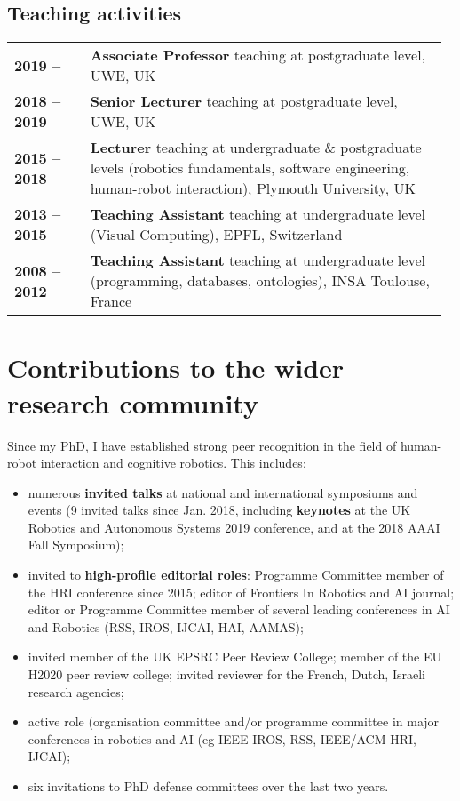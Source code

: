 \subsection{Teaching activities}

\begin{tabular}{p{0.17\linewidth}p{0.8\linewidth}}
    \bf 2019 --  & \textbf{Associate Professor} teaching at postgraduate level, UWE, UK \\
    \bf 2018 -- 2019 & \textbf{Senior Lecturer} teaching at postgraduate level, UWE, UK \\
    \bf 2015 -- 2018 & \textbf{Lecturer} teaching at undergraduate \&
    postgraduate levels (robotics fundamentals, software engineering, human-robot interaction), Plymouth University, UK \\
    \bf 2013 -- 2015 & \textbf{Teaching Assistant} teaching at undergraduate level (Visual Computing), EPFL, Switzerland \\
    \bf 2008 -- 2012 & \textbf{Teaching Assistant} teaching at undergraduate level (programming, databases, ontologies), INSA Toulouse, France \\
\end{tabular}

\vspace{2em}
\section{Contributions to the wider research community}

Since my PhD, I have established strong peer recognition in the field of human-robot interaction
and cognitive robotics. This includes:

\begin{itemize}[noitemsep,topsep=0pt,parsep=0pt,partopsep=0pt]
    \item numerous \textbf{invited talks} at national and international symposiums and
        events (9 invited talks since Jan. 2018, including \textbf{keynotes} at the UK Robotics
and Autonomous Systems 2019 conference, and at the 2018 AAAI Fall Symposium);
    \item invited to \textbf{high-profile editorial roles}: Programme Committee member of the HRI
conference since 2015; editor of Frontiers In Robotics and AI journal; editor or
Programme Committee member of several leading conferences in AI and Robotics
        (RSS, IROS, IJCAI, HAI, AAMAS);
    \item invited member of the UK EPSRC Peer Review College; member of the EU
        H2020 peer review college; invited reviewer for the French, Dutch, Israeli research agencies;
    \item active role (organisation committee and/or programme committee in
        major conferences in robotics and AI (eg IEEE IROS, RSS, IEEE/ACM HRI, IJCAI);
    \item six invitations to PhD defense committees over the last two years.
\end{itemize}


